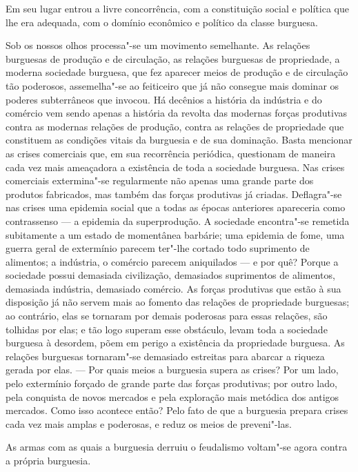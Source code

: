 Em seu lugar entrou a livre concorrência, com a constituição social e
política que lhe era adequada, com o domínio econômico e político da
classe burguesa.

Sob os nossos olhos processa"-se um movimento semelhante. As relações
burguesas de produção e de circulação, as relações burguesas de
propriedade, a moderna sociedade burguesa, que fez aparecer meios de
produção e de circulação tão poderosos, assemelha"-se ao feiticeiro
que já não consegue mais dominar os poderes subterrâneos que invocou.
Há decênios a história da indústria e do comércio vem sendo apenas a
história da revolta das modernas forças produtivas contra as modernas
relações de produção, contra as relações de propriedade que constituem
as condições vitais da burguesia e de sua dominação. Basta mencionar as
crises comerciais que, em sua recorrência periódica, questionam de
maneira cada vez mais ameaçadora a existência de toda a sociedade
burguesa. Nas crises comerciais extermina"-se regularmente não apenas
uma grande parte dos produtos fabricados, mas também das forças
produtivas já criadas. Deflagra"-se nas crises uma epidemia social que
a todas as épocas anteriores apareceria como contrassenso  ---  a
epidemia da superprodução. A sociedade encontra"-se remetida
subitamente a um estado de momentânea barbárie; uma epidemia de fome,
uma guerra geral de extermínio parecem ter"-lhe cortado todo
suprimento de alimentos; a indústria, o comércio parecem aniquilados  --- 
e por quê? Porque a sociedade possui demasiada civilização, demasiados
suprimentos de alimentos, demasiada indústria, demasiado comércio. As
forças produtivas que estão à sua disposição já não servem mais ao
fomento das relações de propriedade burguesas; ao contrário, elas se
tornaram por demais poderosas para essas relações, são tolhidas por
elas; e tão logo superam esse obstáculo, levam toda a sociedade
burguesa à desordem, põem em perigo a existência da propriedade
burguesa. As relações burguesas tornaram"-se demasiado estreitas para
abarcar a riqueza gerada por elas. --- Por quais meios a burguesia supera    \label{9}
as crises? Por um lado, pelo extermínio forçado de grande parte das
forças produtivas; por outro lado, pela conquista de novos mercados e
pela exploração mais metódica dos antigos mercados. Como isso acontece
então? Pelo fato de que a burguesia prepara crises cada vez mais amplas
e poderosas, e reduz os meios de preveni"-las.

As armas com as quais a burguesia derruiu o feudalismo voltam"-se agora     \label{4}
contra a própria burguesia.

